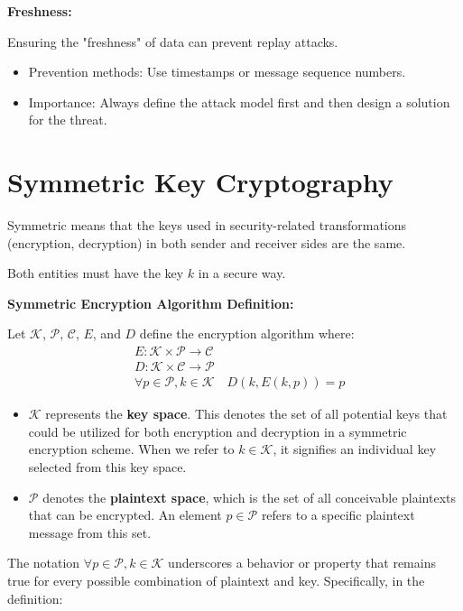 \documentclass[12pt]{article}
\begin{document}
\noindent\textbf{Freshness:}

Ensuring the "freshness" of data can prevent replay attacks.

\begin{itemize}
    \item Prevention methods: Use timestamps or message sequence numbers.
    \item Importance: Always define the attack model first and then design a solution for the threat.
\end{itemize}


\section*{Symmetric Key Cryptography}

Symmetric means that the keys used in security-related transformations (encryption, decryption) in both sender and receiver sides are the same.

Both entities must have the key \(k\) in a secure way.

\noindent\textbf{Symmetric Encryption Algorithm Definition:}

Let \( \mathcal{K} \), \( \mathcal{P} \), \( \mathcal{C} \), \( E \), and \( D \) define the encryption algorithm where:
\begin{align*}
& E: \mathcal{K} \times \mathcal{P} \rightarrow \mathcal{C} \\
& D: \mathcal{K} \times \mathcal{C} \rightarrow \mathcal{P} \\
& \forall p \in \mathcal{P}, k \in \mathcal{K} \quad D(k, E(k, p)) = p
\end{align*}

\begin{itemize}
    \item \( \mathcal{K} \) represents the \textbf{key space}. This denotes the set of all potential keys that could be utilized for both encryption and decryption in a symmetric encryption scheme. When we refer to \( k \in \mathcal{K} \), it signifies an individual key selected from this key space.

    \item \( \mathcal{P} \) denotes the \textbf{plaintext space}, which is the set of all conceivable plaintexts that can be encrypted. An element \( p \in \mathcal{P} \) refers to a specific plaintext message from this set.
\end{itemize}

The notation \( \forall p \in \mathcal{P}, k \in \mathcal{K} \) underscores a behavior or property that remains true for every possible combination of plaintext and key. Specifically, in the definition:
\end{document}
